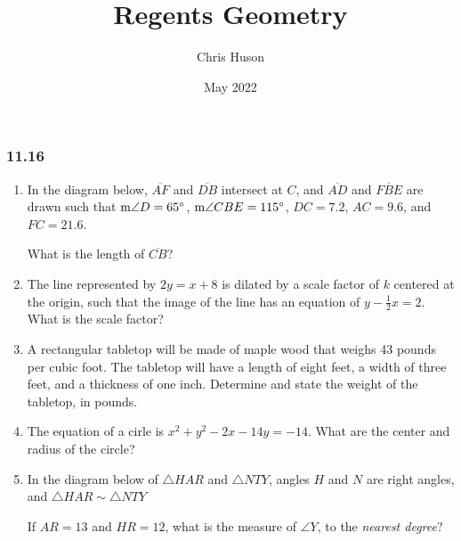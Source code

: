 \documentclass[12pt, oneside]{article}
\title{Regents Geometry}
\author{Chris Huson}
\date{May 2022}
\begin{document}
\subsubsection*{11.16 }
\begin{enumerate}[itemsep=1.2cm]
    \item In the diagram below, $\overline{AF}$ and $\overline{DB}$ intersect at $C$, and $\overline{AD}$ and $\overline{FBE}$ are drawn such that $\textup{m}\angle D = 65^\circ$, $\textup{m}\angle CBE = 115^\circ$, $DC=7.2$, $AC=9.6$, and $FC=21.6$.
    \begin{center}
    \end{center}
    What is the length of $\overline{CB}$?

\item The line represented by $2y=x+8$ is dilated by a scale factor of $k$ centered at the origin, such that the image of the line has an equation of $y - \frac{1}{2} x=2$. What is the scale factor?

\item A rectangular tabletop will be made of maple wood that weighs 43 pounds per cubic foot. The tabletop will have a length of eight feet, a width of three feet, and a thickness of one inch. Determine and state the weight of the tabletop, in pounds.

\item The equation of a cirle is $x^2+y^2-2x-14y=-14$. What are the center and radius of the circle?

\item In the diagram below of $\triangle HAR$ and $\triangle NTY$, angles $H$ and $N$ are right angles, and $\triangle HAR \sim \triangle NTY$
\begin{center}
\end{center}
If $AR=13$ and $HR=12$, what is the measure of $\angle Y$, to the \emph{nearest degree}?


\end{enumerate}
\end{document}
